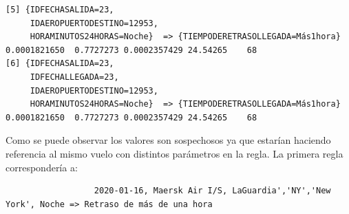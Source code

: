 \documentclass{article}
\begin{document}
\begin{lstlisting}
[5] {IDFECHASALIDA=23,                                                                                                  
     IDAEROPUERTODESTINO=12953,                                                                                         
     HORAMINUTOS24HORAS=Noche}  => {TIEMPODERETRASOLLEGADA=Más1hora} 0.0001821650  0.7727273 0.0002357429 24.54265    68
[6] {IDFECHASALIDA=23,                                                                                                  
     IDFECHALLEGADA=23,                                                                                                 
     IDAEROPUERTODESTINO=12953,                                                                                         
     HORAMINUTOS24HORAS=Noche}  => {TIEMPODERETRASOLLEGADA=Más1hora} 0.0001821650  0.7727273 0.0002357429 24.54265    68
\end{lstlisting}

Como se puede observar los valores son sospechosos ya que estarían haciendo referencia al mismo vuelo con distintos parámetros en la regla. 
La primera regla correspondería a:
\begin{lstlisting}
                  2020-01-16, Maersk Air I/S, LaGuardia','NY','New York', Noche => Retraso de más de una hora
\end{lstlisting}
\end{document}
